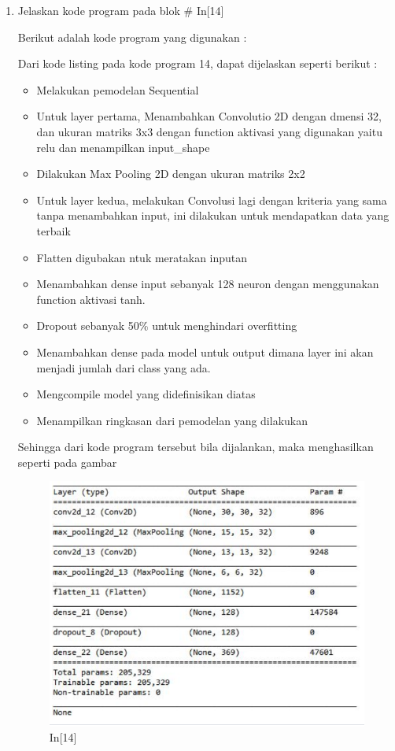 \begin{enumerate}
\begin{figure}[!htbp]
\end{figure}
\item Jelaskan kode program pada blok \# In[14]
\par Berikut adalah kode program yang digunakan :

\par Dari kode listing pada kode program 14, dapat dijelaskan seperti berikut :
\begin{itemize}
\item Melakukan pemodelan Sequential
\item Untuk layer pertama, Menambahkan Convolutio 2D dengan dmensi 32, dan ukuran matriks 3x3 dengan function aktivasi yang digunakan yaitu relu dan menampilkan input\_shape
\item Dilakukan Max Pooling 2D dengan ukuran matriks 2x2
\item Untuk layer kedua, melakukan Convolusi lagi dengan kriteria yang sama tanpa menambahkan input, ini dilakukan untuk mendapatkan data yang terbaik
\item Flatten digubakan ntuk meratakan inputan
\item Menambahkan dense input sebanyak 128 neuron dengan menggunakan function aktivasi tanh.
\item Dropout sebanyak 50\% untuk menghindari overfitting
\item Menambahkan dense pada model untuk output dimana layer ini akan menjadi jumlah dari class yang ada.
\item Mengcompile model yang didefinisikan diatas
\item Menampilkan ringkasan dari pemodelan yang dilakukan
\end{itemize}
\par Sehingga dari kode program tersebut bila dijalankan, maka menghasilkan seperti pada gambar 
\begin{figure}[!htbp]
	\centerline{\includegraphics[width=1\textwidth]{figures/andi/p14.PNG}}
	\caption{In[14]}


\end{figure}
\end{enumerate}
